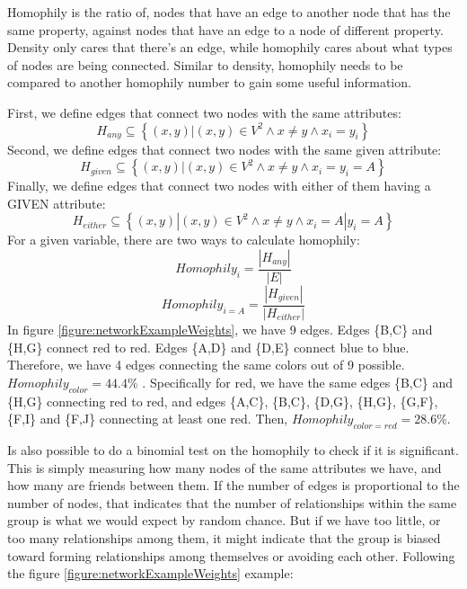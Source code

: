 Homophily is the ratio of, nodes that have an edge to another node that has the same property, against nodes that have an edge to a node of different property. Density only cares that there's an edge, while homophily cares about what types of nodes are being connected. Similar to density, homophily needs to be compared to another homophily number to gain some useful information.

First, we define edges that connect two nodes with the same attributes:
    \begin{equation}
        H_{any} \subseteq  \left\{ (x,y) | (x,y) \in V^2  \land x \neq y  \land x_i = y_i \right\}
    \end{equation}
Second, we define edges that connect two nodes with the same given attribute:
    \begin{equation}
        H_{given} \subseteq  \left\{ (x,y) | (x,y) \in V^2  \land x \neq y  \land x_i = y_i = A \right\}      
    \end{equation}
Finally, we define edges that connect two nodes with either of them having a GIVEN attribute:
    \begin{equation}
        H_{either} \subseteq  \left\{ (x,y) | (x,y) \in V^2   \land  x \neq y \land  x_i = A | y_i = A \right\}
    \end{equation}    
For a given variable, there are two ways to calculate homophily:
    \begin{equation}
        Homophily_i =  \frac{|H_{any}|}{|E|}
    \end{equation}
    \begin{equation}
        Homophily_{i=A} =  \frac{|H_{given}|}{|H_{either}|}      
    \end{equation}
In figure \ref{figure:networkExampleWeights}, we have 9 edges. Edges \{B,C\} and \{H,G\} connect red to red. Edges \{A,D\} and \{D,E\} connect blue to blue. Therefore, we have 4 edges connecting the same colors out of 9 possible. $Homophily_{color} = 44.4\%$ . Specifically for red, we have the same edges \{B,C\} and \{H,G\} connecting red to red, and edges \{A,C\}, \{B,C\}, \{D,G\}, \{H,G\}, \{G,F\}, \{F,I\} and \{F,J\} connecting at least one red. Then, $Homophily_{color = red} = 28.6\%$.

Is also possible to do a binomial test on the homophily to check if it is significant. This is simply measuring how many nodes of the same attributes we have, and how many are friends between them. If the number of edges is proportional to the number of nodes, that indicates that the number of relationships within the same group is what we would expect by random chance. But if we have too little, or too many relationships among them, it might indicate that the group is biased toward forming relationships among themselves or avoiding each other. Following the figure \ref{figure:networkExampleWeights} example:

